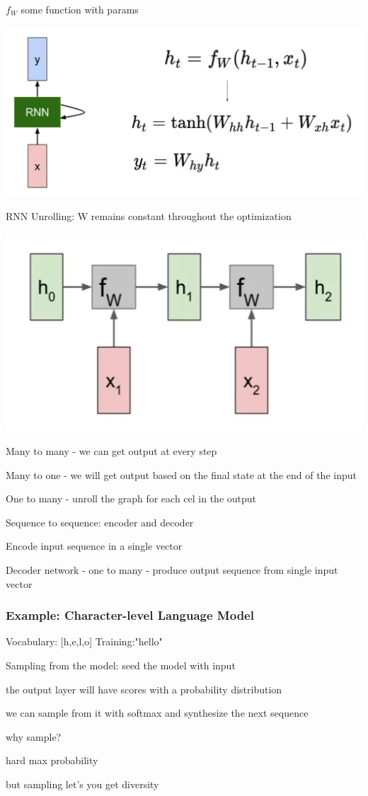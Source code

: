 $f_W$ some function with params

\includegraphics[width=0.5\columnwidth]{fei_fei_li/lecture_10/rnn_formulation.png}

RNN Unrolling: W remains constant throughout the optimization

\includegraphics[width=0.5\columnwidth]{fei_fei_li/lecture_10/rnn_unrolling.png}

Many to many - we can get output at every step

Many to one - we will get output based on the final state at the end of the input

One to many - unroll the graph for each cel in the output

Sequence to sequence: encoder and decoder

Encode input sequence in a single vector

Decoder network - one to many - produce output sequence from single input vector

\subsubsection{Example: Character-level Language Model}

Vocabulary: [h,e,l,o]
Training:"hello"

Sampling from the model: seed the model with input

the output layer will have scores with a probability distribution

we can sample from it with softmax and synthesize the next sequence

why sample? 

hard max probability

but sampling let's you get diversity

